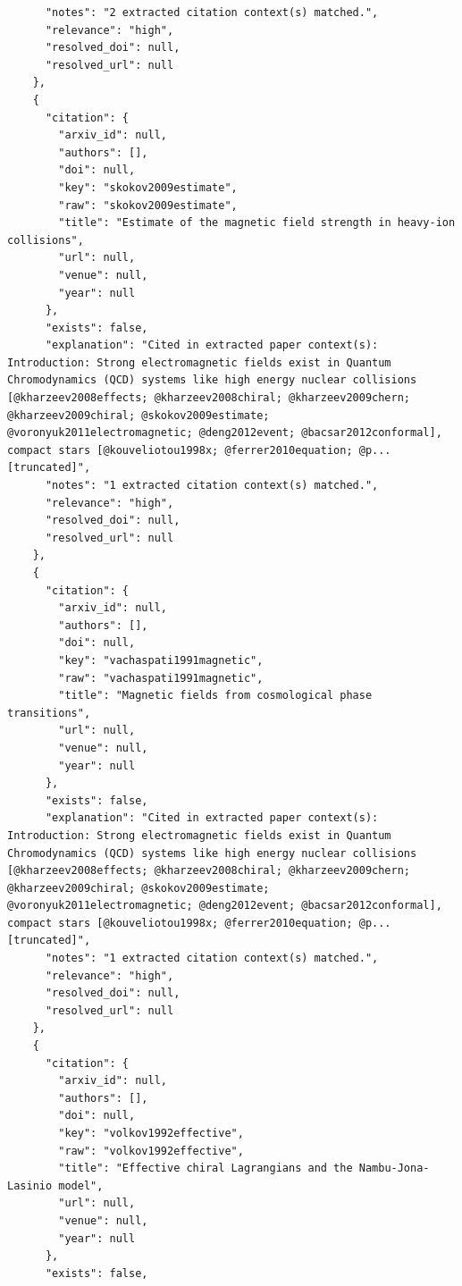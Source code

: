 \documentclass[11pt]{article}
\begin{document}
\begin{verbatim}
      "notes": "2 extracted citation context(s) matched.",
      "relevance": "high",
      "resolved_doi": null,
      "resolved_url": null
    },
    {
      "citation": {
        "arxiv_id": null,
        "authors": [],
        "doi": null,
        "key": "skokov2009estimate",
        "raw": "skokov2009estimate",
        "title": "Estimate of the magnetic field strength in heavy-ion collisions",
        "url": null,
        "venue": null,
        "year": null
      },
      "exists": false,
      "explanation": "Cited in extracted paper context(s): Introduction: Strong electromagnetic fields exist in Quantum Chromodynamics (QCD) systems like high energy nuclear collisions [@kharzeev2008effects; @kharzeev2008chiral; @kharzeev2009chern; @kharzeev2009chiral; @skokov2009estimate; @voronyuk2011electromagnetic; @deng2012event; @bacsar2012conformal], compact stars [@kouveliotou1998x; @ferrer2010equation; @p... [truncated]",
      "notes": "1 extracted citation context(s) matched.",
      "relevance": "high",
      "resolved_doi": null,
      "resolved_url": null
    },
    {
      "citation": {
        "arxiv_id": null,
        "authors": [],
        "doi": null,
        "key": "vachaspati1991magnetic",
        "raw": "vachaspati1991magnetic",
        "title": "Magnetic fields from cosmological phase transitions",
        "url": null,
        "venue": null,
        "year": null
      },
      "exists": false,
      "explanation": "Cited in extracted paper context(s): Introduction: Strong electromagnetic fields exist in Quantum Chromodynamics (QCD) systems like high energy nuclear collisions [@kharzeev2008effects; @kharzeev2008chiral; @kharzeev2009chern; @kharzeev2009chiral; @skokov2009estimate; @voronyuk2011electromagnetic; @deng2012event; @bacsar2012conformal], compact stars [@kouveliotou1998x; @ferrer2010equation; @p... [truncated]",
      "notes": "1 extracted citation context(s) matched.",
      "relevance": "high",
      "resolved_doi": null,
      "resolved_url": null
    },
    {
      "citation": {
        "arxiv_id": null,
        "authors": [],
        "doi": null,
        "key": "volkov1992effective",
        "raw": "volkov1992effective",
        "title": "Effective chiral Lagrangians and the Nambu-Jona-Lasinio model",
        "url": null,
        "venue": null,
        "year": null
      },
      "exists": false,

\end{verbatim}
\end{document}

